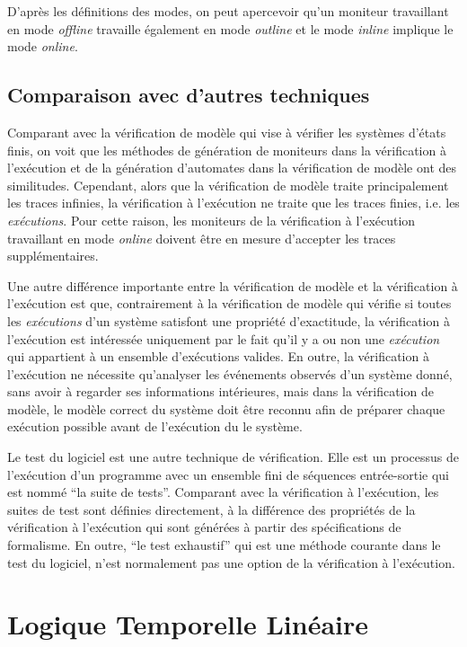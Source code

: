 D'après les définitions des modes, on peut apercevoir qu'un moniteur travaillant en mode \emph{offline} travaille également en mode \emph{outline} et le mode \emph{inline} implique le mode \emph{online}.

\subsection{Comparaison avec d'autres techniques}

Comparant avec la vérification de modèle \citep{clarke1999model} qui vise à vérifier les systèmes d'états finis, on voit que les méthodes de génération de moniteurs dans la vérification à l'exécution et de la génération d'automates dans la vérification de modèle ont des similitudes. Cependant, alors que la vérification de modèle traite principalement les traces infinies, la vérification à l'exécution ne traite que les traces finies, i.e. les \emph{exécutions}. Pour cette raison, les moniteurs de la vérification à l'exécution travaillant en mode \emph{online} doivent être en mesure d'accepter les traces supplémentaires.

Une autre différence importante entre la vérification de modèle et la vérification à l'exécution est que, contrairement à la vérification de modèle qui vérifie si toutes les \emph{exécutions} d'un système satisfont une propriété d'exactitude, la vérification à l'exécution est intéressée uniquement par le fait qu'il y a ou non une \emph{exécution} qui appartient à un ensemble d'exécutions valides. En outre, la vérification à l'exécution ne nécessite qu'analyser les événements observés d'un système donné, sans avoir à regarder ses informations intérieures, mais dans la vérification de modèle, le modèle correct du système doit être reconnu afin de préparer chaque exécution possible avant de l'exécution du le système. \citep{leucker2009brief}

Le test du logiciel \citep{broy2005model} est une autre technique de vérification. Elle est un processus de l'exécution d'un programme avec un ensemble fini de séquences entrée-sortie qui est nommé ``la suite de tests''. Comparant avec la vérification à l'exécution, les suites de test sont définies directement, à la différence des propriétés de la vérification à l'exécution qui sont générées à partir des spécifications de formalisme. En outre, ``le test exhaustif'' qui est une méthode courante dans le test du logiciel, n'est normalement pas une option de la vérification à l'exécution.

\section{Logique Temporelle Linéaire}

